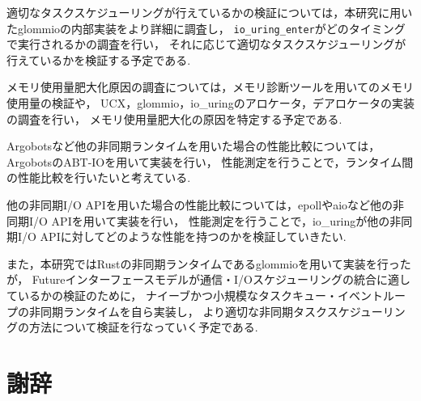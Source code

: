 \documentclass[a4paper,11pt]{jreport}
\begin{document}
適切なタスクスケジューリングが行えているかの検証については，本研究に用いたglommioの内部実装をより詳細に調査し，
\lstinline|io_uring_enter|がどのタイミングで実行されるかの調査を行い，
それに応じて適切なタスクスケジューリングが行えているかを検証する予定である.

メモリ使用量肥大化原因の調査については，メモリ診断ツールを用いてのメモリ使用量の検証や，
UCX，glommio，io\_uringのアロケータ，デアロケータの実装の調査を行い，
メモリ使用量肥大化の原因を特定する予定である.

Argobotsなど他の非同期ランタイムを用いた場合の性能比較については，　ArgobotsのABT-IOを用いて実装を行い，
性能測定を行うことで，ランタイム間の性能比較を行いたいと考えている.

他の非同期I/O APIを用いた場合の性能比較については，epollやaioなど他の非同期I/O APIを用いて実装を行い，
性能測定を行うことで，io\_uringが他の非同期I/O APIに対してどのような性能を持つのかを検証していきたい.

また，本研究ではRustの非同期ランタイムであるglommioを用いて実装を行ったが，
Futureインターフェースモデルが通信・I/Oスケジューリングの統合に適しているかの検証のために，
ナイーブかつ小規模なタスクキュー・イベントループの非同期ランタイムを自ら実装し，
より適切な非同期タスクスケジューリングの方法について検証を行なっていく予定である.


\chapter*{謝辞}

\newpage

\renewcommand{\bibname}{参考文献}

%
%





\nocite{*}


\end{document}
